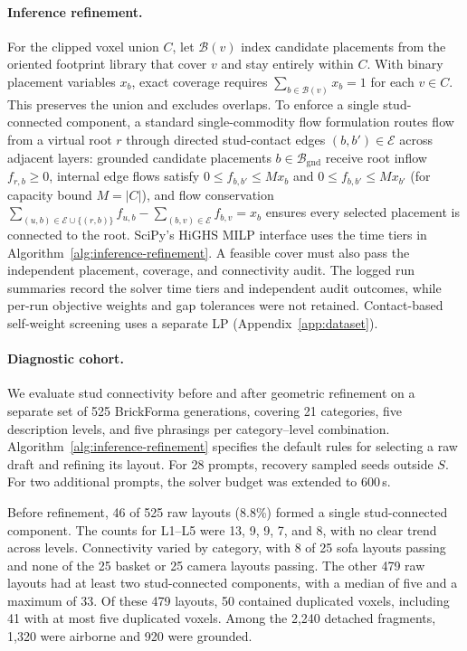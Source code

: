 \documentclass[letterpaper]{article} %
\begin{document}
\paragraph{Inference refinement.}
For the clipped voxel union $C$, let $\mathcal{B}(v)$ index candidate placements from the oriented footprint library that cover $v$ and stay entirely within $C$. With binary placement variables $x_b$, exact coverage requires $\sum_{b\in\mathcal{B}(v)}x_b=1$ for each $v\in C$. This preserves the union and excludes overlaps. To enforce a single stud-connected component, a standard single-commodity flow formulation routes flow from a virtual root $r$ through directed stud-contact edges $(b,b')\in\mathcal{E}$ across adjacent layers: grounded candidate placements $b\in\mathcal{B}_{\mathrm{gnd}}$ receive root inflow $f_{r,b}\ge 0$, internal edge flows satisfy $0\le f_{b,b'}\le M x_b$ and $0\le f_{b,b'}\le M x_{b'}$ (for capacity bound $M=|C|$), and flow conservation $\sum_{(u,b)\in\mathcal{E}\cup\{(r,b)\}} f_{u,b} - \sum_{(b,v)\in\mathcal{E}} f_{b,v} = x_b$ ensures every selected placement is connected to the root. SciPy's HiGHS MILP interface uses the time tiers in Algorithm~\ref{alg:inference-refinement}. A feasible cover must also pass the independent placement, coverage, and connectivity audit. The logged run summaries record the solver time tiers and independent audit outcomes, while per-run objective weights and gap tolerances were not retained. Contact-based self-weight screening uses a separate LP (Appendix~\ref{app:dataset}).

\paragraph{Diagnostic cohort.}
We evaluate stud connectivity before and after geometric refinement on a separate set of 525 BrickForma generations, covering 21 categories, five description levels, and five phrasings per category--level combination. Algorithm~\ref{alg:inference-refinement} specifies the default rules for selecting a raw draft and refining its layout. For 28 prompts, recovery sampled seeds outside $S$. For two additional prompts, the solver budget was extended to 600\,s.

Before refinement, 46 of 525 raw layouts (8.8\%) formed a single stud-connected component. The counts for L1--L5 were 13, 9, 9, 7, and 8, with no clear trend across levels. Connectivity varied by category, with 8 of 25 sofa layouts passing and none of the 25 basket or 25 camera layouts passing. The other 479 raw layouts had at least two stud-connected components, with a median of five and a maximum of 33. Of these 479 layouts, 50 contained duplicated voxels, including 41 with at most five duplicated voxels. Among the 2,240 detached fragments, 1,320 were airborne and 920 were grounded.
\end{document}
